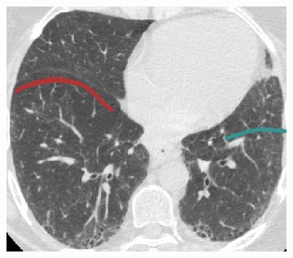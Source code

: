 {\begin{figure}[htbp]
\begin{subfigure}{.32\linewidth}
\end{subfigure}
\begin{subfigure}{.32\linewidth}%
  \includegraphics[width=\linewidth,trim={{.0\wd0} {.0\wd0} {.0\wd0} {.0\wd0}},clip]{Segmentation/Image/IPF203_PCAGuessing125_Axial.png}

\end{subfigure}
\end{figure}}
